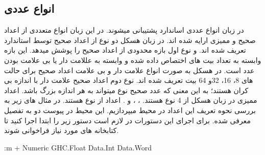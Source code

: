 \subsection{
انواع عددی
}
در زبان 
 انواع عددی اساندارد پشتیبانی میشوند. در این زبان انواع متعددی از اعداد صحیح و ممیزی ارایه شده اند.
\newline
در زبان هسکل دو نوع از اعداد صحیح توسط استاندارد تعریف شده اند. 
و
نوع اول بازه محدودی از اعداد صحیح را پوشش میدهد. این بازه وابسته به تعداد بیت های اختصاص داده شده و وابسته به عللامت دار یا بی علامت بودن عدد است. در هسکل به صورت انواع علامت دار و بی علامت اعداد صحیح برای حالت های 8، 16، 32و 64 بیت تعریف شده اند. نوع دوم اعداد صحیح علامت دار با اندازه بی کران هستند؛ به این معنی که عدد صحیح نوع
میتواند به هر اندازه بزرگ باشد. 
\newline
اعداد ممیزی در زبان هسکل از 4 نوع هستند.
،
، 
و 
. اعداد 
از نوع 
هستند. 
 در مثال های زیر به بررسی نحوه تعریف این اعداد در محیط 
میپردازیم. این محیط در 
\label{sec:Appendix II}{
پیوست دو
}
به تفصیل معرفی شده.
\newline
برای اجرای این دستورات در 
لازم است دستور زیر را ابتدا اجرا کنید تا کتابخانه های مورد نیاز فراخوانی شوند.
\begin{latin}
\begin{ghcode}
:m + Numeric GHC.Float Data.Int Data.Word
\end{ghcode}
\end{latin}

\newline

